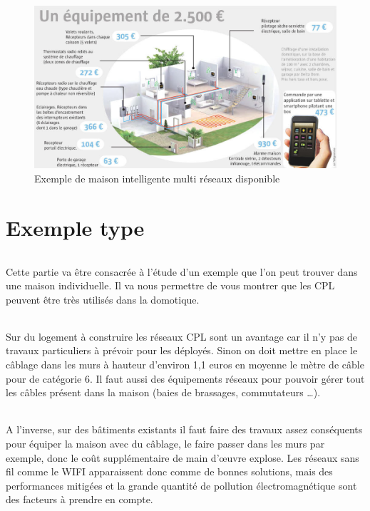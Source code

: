         \begin{figure}[h]
            \begin{center}
                \includegraphics[scale=1.5]{./images/cpl/exempleMaisonIntelligente.jpg}
            \end{center}
                \caption{ Exemple de maison intelligente multi réseaux disponible } %
                \label{Exemple de maison intelligente disponible}
        \end{figure}


    \clearpage
\part{Exemple type}
            \paragraph{}
Cette partie va être consacrée à l'étude d’un exemple que l’on peut trouver dans une maison individuelle.
Il va nous permettre de vous montrer que les CPL peuvent être très utilisés dans la domotique.
            \paragraph{}
Sur du logement à construire les réseaux CPL sont un avantage car il n’y pas de travaux particuliers à prévoir pour les déployés.
Sinon on doit mettre en place le câblage dans les murs à hauteur d’environ 1,1 euros en moyenne le mètre de câble pour de catégorie 6.
Il faut aussi des équipements réseaux pour pouvoir gérer tout les câbles présent dans la maison (baies de brassages, commutateurs …).
            \paragraph{}
A l’inverse, sur des bâtiments existants il faut faire des travaux assez conséquents pour équiper la maison avec du câblage,
le faire passer dans les murs par exemple, donc le coût supplémentaire de main d’œuvre explose.
Les réseaux sans fil comme le WIFI apparaissent donc comme de bonnes solutions,
mais des performances mitigées et la grande quantité de pollution électromagnétique sont des facteurs à prendre en compte.
